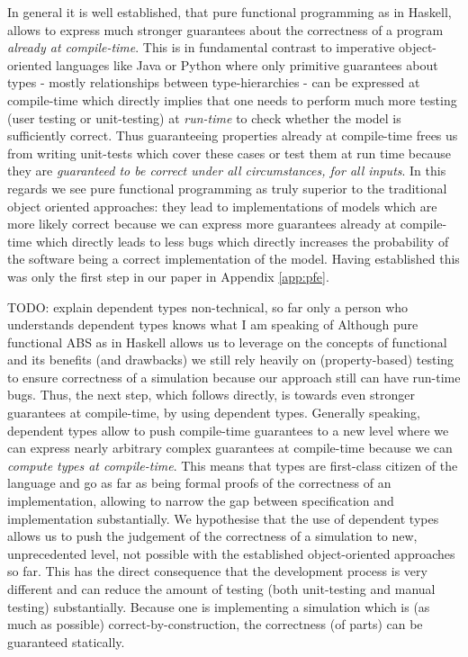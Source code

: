 In general it is well established, that pure functional programming as in Haskell, allows to express much stronger guarantees about the correctness of a program \textit{already at compile-time}. This is in fundamental contrast to imperative object-oriented languages like Java or Python where only primitive guarantees about types - mostly relationships between type-hierarchies - can be expressed at compile-time which directly implies that one needs to perform much more testing (user testing or unit-testing) at \textit{run-time} to check whether the model is sufficiently correct. Thus guaranteeing properties already at compile-time frees us from writing unit-tests which cover these cases or test them at run time because they are \textit{guaranteed to be correct under all circumstances, for all inputs}. In this regards we see pure functional programming as truly superior to the traditional object oriented approaches: they lead to implementations of models which are more likely correct because we can express more guarantees already at compile-time which directly leads to less bugs which directly increases the probability of the software being a correct implementation of the model. Having established this was only the first step in our paper in Appendix \ref{app:pfe}. 

TODO: explain dependent types non-technical, so far only a person who understands dependent types knows what I am speaking of
Although pure functional ABS as in Haskell allows us to leverage on the concepts of functional and its benefits (and drawbacks) we still rely heavily on (property-based) testing to ensure correctness of a simulation because our approach still can have run-time bugs. Thus, the next step, which follows directly, is towards even stronger guarantees at compile-time, by using dependent types. Generally speaking, dependent types allow to push compile-time guarantees to a new level where we can express nearly arbitrary complex guarantees at compile-time because we can \textit{compute types at compile-time}. This means that types are first-class citizen of the language and go as far as being formal proofs of the correctness of an implementation, allowing to narrow the gap between specification and implementation substantially. We hypothesise that the use of dependent types allows us to push the judgement of the correctness of a simulation to new, unprecedented level, not possible with the established object-oriented approaches so far. This has the direct consequence that the development process is very different and can reduce the amount of testing (both unit-testing and manual testing) substantially. Because one is implementing a simulation which is (as much as possible) correct-by-construction, the correctness (of parts) can be guaranteed statically.

